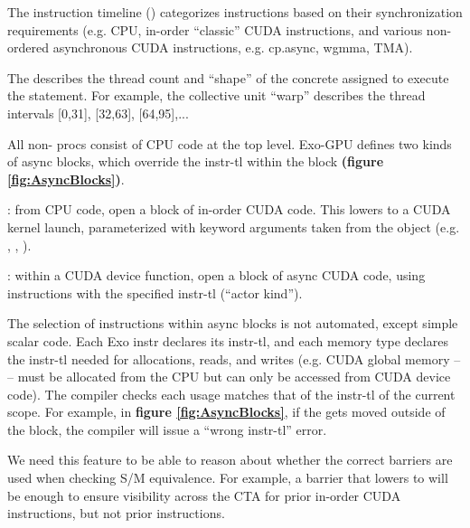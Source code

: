 \filbreak
The instruction timeline () categorizes instructions based on their synchronization requirements (e.g. CPU, in-order ``classic'' CUDA instructions, and various non-ordered asynchronous CUDA instructions, e.g. cp.async, wgmma, TMA).

\filbreak
The  describes the thread count and ``shape'' of the concrete  assigned to execute the statement.
For example, the collective unit ``warp'' describes the thread intervals [0,31], [32,63], [64,95],...

\filbreak
{}


\begin{figure*}[!b]

\caption{Example async blocks, with sm\_80 cp.async instructions used}
\label{fig:AsyncBlocks}
\end{figure*}

All non- procs consist of CPU code at the top level.
Exo-GPU defines two kinds of async blocks, which override the instr-tl within the block \textbf{(figure \ref{fig:AsyncBlocks})}.

\filbreak
{}: from CPU code, open a block of in-order CUDA code.
This lowers to a CUDA kernel launch, parameterized with keyword arguments taken from the  object (e.g. , , ).

\filbreak
{}: within a CUDA device function, open a block of async CUDA code, using instructions with the specified instr-tl (``actor kind'').

\filbreak
The selection of instructions within async blocks is not automated, except simple scalar code.
Each Exo instr declares its instr-tl, and each memory type declares the instr-tl needed for allocations, reads, and writes (e.g. CUDA global memory --  -- must be allocated from the CPU but can only be accessed from CUDA device code).
The compiler checks each usage matches that of the instr-tl of the current scope.
For example, in \textbf{figure \ref{fig:AsyncBlocks}}, if the  gets moved outside of the  block, the compiler will issue a ``wrong instr-tl'' error.

 We need this feature to be able to reason about whether the correct barriers are used when checking S/M equivalence. For example, a barrier that lowers to  will be enough to ensure visibility across the CTA for prior in-order CUDA instructions, but not prior  instructions.

